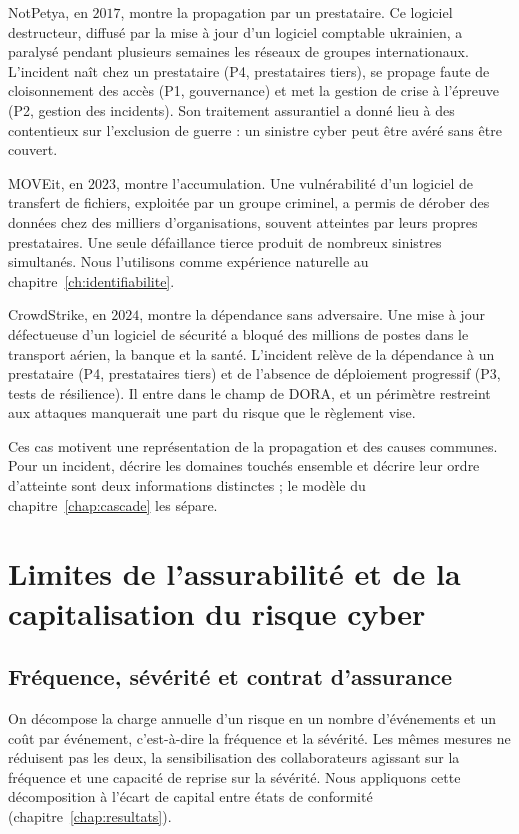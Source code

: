NotPetya, en $2017$, montre la propagation par un prestataire. Ce logiciel destructeur, diffusé par
la mise à jour d'un logiciel comptable ukrainien, a paralysé pendant plusieurs semaines les réseaux
de groupes internationaux. L'incident naît chez un prestataire (P4, prestataires tiers), se propage faute de
cloisonnement des accès (P1, gouvernance) et met la gestion de crise à l'épreuve (P2, gestion des incidents). Son traitement
assurantiel a donné lieu à des contentieux sur l'exclusion de guerre : un sinistre cyber peut être
avéré sans être couvert.

MOVEit, en $2023$, montre l'accumulation. Une vulnérabilité d'un logiciel de transfert de fichiers,
exploitée par un groupe criminel, a permis de dérober des données chez des milliers d'organisations,
souvent atteintes par leurs propres prestataires. Une seule défaillance tierce produit de nombreux
sinistres simultanés. Nous l'utilisons comme expérience naturelle au
chapitre~\ref{ch:identifiabilite}.

CrowdStrike, en $2024$, montre la dépendance sans adversaire. Une mise à jour défectueuse d'un
logiciel de sécurité a bloqué des millions de postes dans le transport aérien, la banque et la
santé. L'incident relève de la dépendance à un prestataire (P4, prestataires tiers) et de l'absence de déploiement
progressif (P3, tests de résilience). Il entre dans le champ de DORA, et un périmètre restreint aux attaques manquerait
une part du risque que le règlement vise.

Ces cas motivent une représentation de la propagation et des causes communes. Pour un incident,
décrire les domaines touchés ensemble et décrire leur ordre d'atteinte sont deux informations
distinctes ; le modèle du chapitre~\ref{chap:cascade} les sépare.

\section{Limites de l'assurabilité et de la capitalisation du risque cyber}
\label{sec:assurabilite-capital}

\subsection{Fréquence, sévérité et contrat d'assurance}
\label{subsec:frequence-severite-contrat}

On décompose la charge annuelle d'un risque en un nombre d'événements et un coût par événement,
c'est-à-dire la fréquence et la sévérité. Les mêmes mesures ne réduisent pas les deux, la
sensibilisation des collaborateurs agissant sur la fréquence et une capacité de reprise sur la
sévérité. Nous appliquons cette décomposition à l'écart de capital entre états de conformité
(chapitre~\ref{chap:resultats}).

